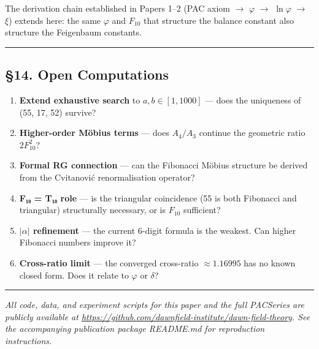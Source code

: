 \documentclass[
  11pt,
  a4paper]{article}
\providecommand{\tightlist}{%
  \setlength{\itemsep}{0pt}\setlength{\parskip}{0pt}}
\begin{document}
The derivation chain established in Papers 1--2 (PAC axiom \(\to\)
\(\varphi\) \(\to\) \(\ln\varphi\) \(\to\) \(\xi\)) extends here: the
same \(\varphi\) and \(F_{10}\) that structure the balance constant also
structure the Feigenbaum constants.

\begin{center}\rule{0.5\linewidth}{0.5pt}\end{center}

\subsection{§14. Open Computations}\label{open-computations}

\begin{enumerate}
\def\labelenumi{\arabic{enumi}.}
\tightlist
\item
  \textbf{Extend exhaustive search} to \(a, b \in [1, 1000]\) --- does
  the uniqueness of (55, 17, 52) survive?
\item
  \textbf{Higher-order Möbius terms} --- does \(A_4/A_3\) continue the
  geometric ratio \(2F_{10}^2\)?
\item
  \textbf{Formal RG connection} --- can the Fibonacci Möbius structure
  be derived from the Cvitanović renormalisation operator?
\item
  \textbf{F₁₀ = T₁₀ role} --- is the triangular coincidence (55 is both
  Fibonacci and triangular) structurally necessary, or is \(F_{10}\)
  sufficient?
\item
  \textbf{\(|\alpha|\) refinement} --- the current 6-digit formula is
  the weakest. Can higher Fibonacci numbers improve it?
\item
  \textbf{Cross-ratio limit} --- the converged cross-ratio
  \(\approx 1.16995\) has no known closed form. Does it relate to
  \(\varphi\) or \(\delta\)?
\end{enumerate}

\begin{center}\rule{0.5\linewidth}{0.5pt}\end{center}

\emph{All code, data, and experiment scripts for this paper and the full
PACSeries are publicly available at
\url{https://github.com/dawnfield-institute/dawn-field-theory}. See the
accompanying publication package README.md for reproduction
instructions.}
\end{document}
